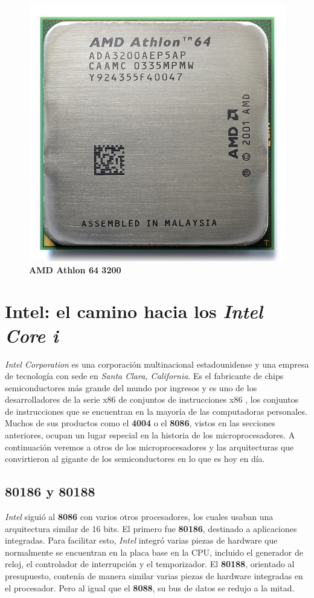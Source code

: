 \begin{figure}[htb]
	\centering
	\includegraphics[scale = 0.15]{Graphics/AMD_Athlon_64_3200+_ADA3200AEP5AP.jpg}
	\caption{\textbf{AMD Athlon 64 3200}}
	\label{fig:20}
\end{figure}

\section{Intel: el camino hacia los \emph{Intel Core i}}
\emph{Intel Corporation} es una corporación multinacional estadounidense y una empresa de tecnología con sede en \emph{Santa Clara, California}. 
Es el fabricante de chips semiconductores más grande del mundo por ingresos y es uno de los desarrolladores de la serie x86 
de conjuntos de instrucciones x86 , los conjuntos de instrucciones que se encuentran en la mayoría de las 
computadoras personales. Muchos de sus productos como el \textbf{4004} o el \textbf{8086}, vistos en las secciones anteriores, ocupan un lugar especial 
en la historia de los microprocesadores. A continuación veremos a otros de los microprocesadores y las arquitecturas que convirtieron 
al gigante de los semiconductores en lo que es hoy en día.\

\subsection{\textbf{80186} y \textbf{80188}}
\emph{Intel} siguió al \textbf{8086} con varios otros procesadores, los cuales usaban una arquitectura similar de 16 bits. El primero fue \textbf{80186}, 
destinado a aplicaciones integradas. Para facilitar esto, \emph{Intel} integró varias piezas de hardware que normalmente se encuentran en la 
placa base en la CPU, incluido el generador de reloj, el controlador de interrupción y el temporizador. El \textbf{80188}, orientado al presupuesto, 
contenía de manera similar varias piezas de hardware integradas en el procesador. Pero al igual que el \textbf{8088}, su bus de datos se redujo a la 
mitad.

